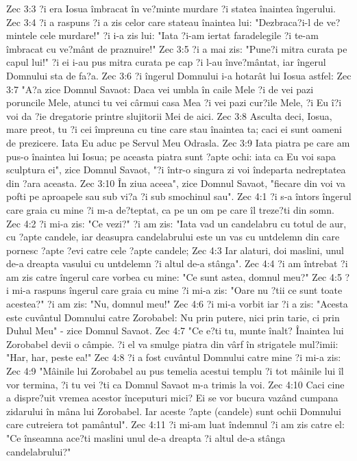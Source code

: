 Zec 3:3  ?i era Iosua îmbracat în ve?minte murdare ?i statea înaintea îngerului.
Zec 3:4  ?i a raspuns ?i a zis celor care stateau înaintea lui: "Dezbraca?i-l de ve?mintele cele murdare!" ?i i-a zis lui: "Iata ?i-am iertat faradelegile ?i te-am îmbracat cu ve?mânt de praznuire!"
Zec 3:5  ?i a mai zis: "Pune?i mitra curata pe capul lui!" ?i ei i-au pus mitra curata pe cap ?i l-au înve?mântat, iar îngerul Domnului sta de fa?a.
Zec 3:6  ?i îngerul Domnului i-a hotarât lui Iosua astfel:
Zec 3:7  "A?a zice Domnul Savaot: Daca vei umbla în caile Mele ?i de vei pazi poruncile Mele, atunci tu vei cârmui casa Mea ?i vei pazi cur?ile Mele, ?i Eu î?i voi da ?ie dregatorie printre slujitorii Mei de aici.
Zec 3:8  Asculta deci, Iosua, mare preot, tu ?i cei împreuna cu tine care stau înaintea ta; caci ei sunt oameni de prezicere. Iata Eu aduc pe Servul Meu Odrasla.
Zec 3:9  Iata piatra pe care am pus-o înaintea lui Iosua; pe aceasta piatra sunt ?apte ochi: iata ca Eu voi sapa sculptura ei", zice Domnul Savaot, "?i într-o singura zi voi îndeparta nedreptatea din ?ara aceasta.
Zec 3:10  În ziua aceea", zice Domnul Savaot, "fiecare din voi va pofti pe aproapele sau sub vi?a ?i sub smochinul sau".
Zec 4:1  ?i s-a întors îngerul care graia cu mine ?i m-a de?teptat, ca pe un om pe care îl treze?ti din somn.
Zec 4:2  ?i mi-a zis: "Ce vezi?" ?i am zis: "Iata vad un candelabru cu totul de aur, cu ?apte candele, iar deasupra candelabrului este un vas cu untdelemn din care pornesc ?apte ?evi catre cele ?apte candele;
Zec 4:3  Iar alaturi, doi maslini, unul de-a dreapta vasului cu untdelemn ?i altul de-a stânga".
Zec 4:4  ?i am întrebat ?i am zis catre îngerul care vorbea cu mine: "Ce sunt astea, domnul meu?"
Zec 4:5  ?i mi-a raspuns îngerul care graia cu mine ?i mi-a zis: "Oare nu ?tii ce sunt toate acestea?" ?i am zis: "Nu, domnul meu!"
Zec 4:6  ?i mi-a vorbit iar ?i a zis: "Acesta este cuvântul Domnului catre Zorobabel: Nu prin putere, nici prin tarie, ci prin Duhul Meu" - zice Domnul Savaot.
Zec 4:7  "Ce e?ti tu, munte înalt? Înaintea lui Zorobabel devii o câmpie. ?i el va smulge piatra din vârf în strigatele mul?imii: "Har, har, peste ea!"
Zec 4:8  ?i a fost cuvântul Domnului catre mine ?i mi-a zis:
Zec 4:9  "Mâinile lui Zorobabel au pus temelia acestui templu ?i tot mâinile lui îl vor termina, ?i tu vei ?ti ca Domnul Savaot m-a trimis la voi.
Zec 4:10  Caci cine a dispre?uit vremea acestor începuturi mici? Ei se vor bucura vazând cumpana zidarului în mâna lui Zorobabel. Iar aceste ?apte (candele) sunt ochii Domnului care cutreiera tot pamântul".
Zec 4:11  ?i mi-am luat îndemnul ?i am zis catre el: "Ce înseamna ace?ti maslini unul de-a dreapta ?i altul de-a stânga candelabrului?"
